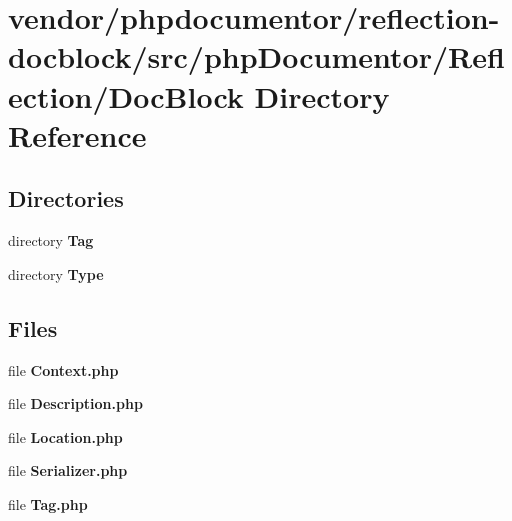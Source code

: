 \section{vendor/phpdocumentor/reflection-\/docblock/src/php\+Documentor/\+Reflection/\+Doc\+Block Directory Reference}
\label{dir_d0816d344a2cfe878a08033b4d804c0e}
\subsection*{Directories}
\begin{DoxyCompactItemize}
\item 
directory {\bf Tag}
\item 
directory {\bf Type}
\end{DoxyCompactItemize}
\subsection*{Files}
\begin{DoxyCompactItemize}
\item 
file {\bf Context.\+php}
\item 
file {\bf Description.\+php}
\item 
file {\bf Location.\+php}
\item 
file {\bf Serializer.\+php}
\item 
file {\bf Tag.\+php}
\end{DoxyCompactItemize}
